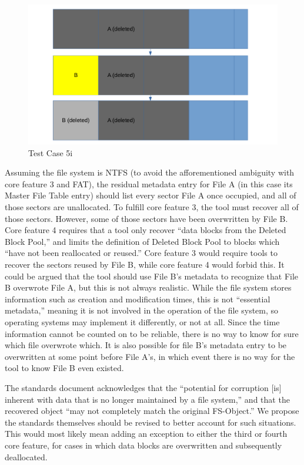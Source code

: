 \begin{figure}[h]
    \centering
    \includegraphics[width=\linewidth]{fig/case5i.png}
    \caption{Test Case 5i}
    \label{fig:case_5i}
\end{figure}

Assuming the file system is NTFS (to avoid the afforementioned ambiguity with core feature 3 and FAT), the residual metadata entry for File A (in this case its Master File Table entry) should list every sector File A once occupied, and all of those sectors are unallocated. 
To fulfill core feature 3, the tool must recover all of those sectors. 
However, some of those sectors have been overwritten by File B. Core feature 4 requires that a tool only recover ``data blocks from the Deleted Block Pool,''\cite{meta:dfr:standards} and limits the definition of Deleted Block Pool to blocks which ``have not been reallocated or reused.''\cite{meta:dfr:standards}
Core feature 3 would require tools to recover the sectors reused by File B, while core feature 4 would forbid this. 
It could be argued that the tool should use File B's metadata to recognize that File B overwrote File A, but this is not always realistic. 
While the file system stores information such as creation and modification times, this is not ``essential metadata,'' meaning it is not involved in the operation of the file system, so operating systems may implement it differently, or not at all.\cite{carrier:filesystems}
Since the time information cannot be counted on to be reliable, there is no way to know for sure which file overwrote which. 
It is also possible for file B's metadata entry to be overwritten at some point before File A's, in which event there is no way for the tool to know File B even existed.

The standards document acknowledges that the ``potential for corruption [is] inherent with data that is no longer maintained by a file system,''\cite{meta:dfr:standards} and that the recovered object ``may not completely match the original FS-Object.''\cite{meta:dfr:standards}
We propose the standards themselves should be revised to better account for such situations.
This would most likely mean adding an exception to either the third or fourth core feature, for cases in which data blocks are overwritten and subsequently deallocated.
